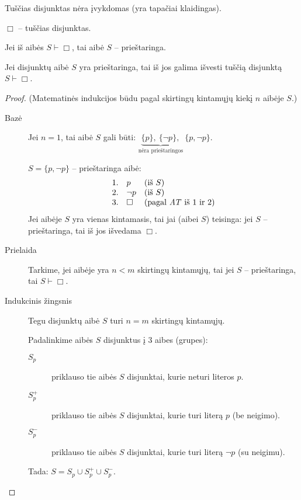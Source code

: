 Tuščias disjunktas nėra įvykdomas (yra tapačiai klaidingas).
\begin{notation}
  $\Box$ – tuščias disjunktas.
\end{notation}

Jei iš aibės $S \vdash \Box$, tai aibė $S$ – prieštaringa.

\begin{prop}
  Jei disjunktų aibė $S$ yra prieštaringa, tai iš jos galima išvesti 
  tuščią disjunktą $S \vdash \Box$.

  \begin{proof}
    (Matematinės indukcijos būdu pagal skirtingų kintamųjų kiekį $n$ 
    aibėje $S$.)

    \begin{description}
      \item[Bazė] Jei $n = 1$, tai aibė $S$ gali būti: 
        $\underbrace{\{p\},\: \{\neg p\},}_{\text{nėra prieštaringos}}%
        \:\{p,\neg p\}$.

        $S = \{p, \neg p\}$ – prieštaringa aibė:
        \[
        \begin{array}{l l l}
          1. & p & (\text{iš }S) \\
          2. & \neg p & (\text{iš }S) \\
          3. & \Box & (\text{pagal \emph{AT} iš 1 ir 2})
        \end{array}
        \]
        Jei aibėje $S$ yra vienas kintamasis, tai jai (aibei $S$)
        teisinga: jei $S$ – prieštaringa, tai iš jos išvedama $\Box$.

      \item[Prielaida] Tarkime, jei aibėje yra $n < m$ skirtingų 
        kintamųjų, tai jei $S$ – prieštaringa, tai $S \vdash \Box$.

      \item[Indukcinis žingsnis] Tegu disjunktų aibė $S$ turi $n = m$
        skirtingų kintamųjų.

        Padalinkime aibės $S$ disjunktus į 3 aibes (grupes):
        \begin{description}
          \item[$S_{p}$] priklauso tie aibės $S$ disjunktai, kurie neturi
            literos $p$.
          \item[$S_{p}^{+}$] priklauso tie aibės $S$ disjunktai, kurie turi
            literą $p$ (be neigimo).
          \item[$S_{p}^{-}$] priklauso tie aibės $S$ disjunktai, kurie turi
            literą $\neg p$ (su neigimu).
        \end{description}
        Tada: $S = S_{p} \cup S_{p}^{+} \cup S_{p}^{-}$.


\end{description}
\end{proof}
\end{prop}
